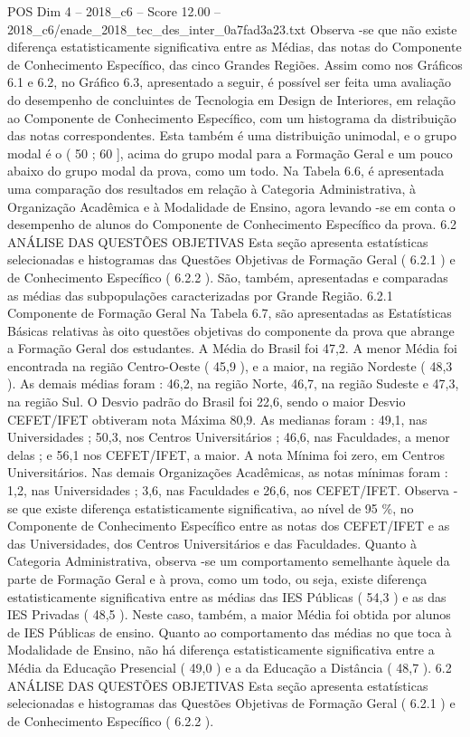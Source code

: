 \begin{textsample}{POS Dim 4 – 2018\_c6 – Score 12.00 – 2018\_c6/enade\_2018\_tec\_des\_inter\_0a7fad3a23.txt}
Observa -se que não existe diferença estatisticamente significativa entre as Médias, das notas do Componente de Conhecimento Específico, das cinco Grandes Regiões.
Assim como nos Gráficos 6.1 e 6.2, no Gráfico 6.3, apresentado a seguir, é possível ser feita uma avaliação do desempenho de concluintes de Tecnologia em Design de Interiores, em relação ao Componente de Conhecimento Específico, com um histograma da distribuição das notas correspondentes.
Esta também é uma distribuição unimodal, e o grupo modal é o ( 50 ; 60 ], acima do grupo modal para a Formação Geral e um pouco abaixo do grupo modal da prova, como um todo.
Na Tabela 6.6, é apresentada uma comparação dos resultados em relação à Categoria Administrativa, à Organização Acadêmica e à Modalidade de Ensino, agora levando -se em conta o desempenho de alunos do Componente de Conhecimento Específico da prova. 6.2 ANÁLISE DAS QUESTÕES OBJETIVAS Esta seção apresenta estatísticas selecionadas e histogramas das Questões Objetivas de Formação Geral ( 6.2.1 ) e de Conhecimento Específico ( 6.2.2 ).
São, também, apresentadas e comparadas as médias das subpopulações caracterizadas por Grande Região. 6.2.1 Componente de Formação Geral Na Tabela 6.7, são apresentadas as Estatísticas Básicas relativas às oito questões objetivas do componente da prova que abrange a Formação Geral dos estudantes.
A Média do Brasil foi 47,2.
A menor Média foi encontrada na região Centro-Oeste ( 45,9 ), e a maior, na região Nordeste ( 48,3 ).
As demais médias foram : 46,2, na região Norte, 46,7, na região Sudeste e 47,3, na região Sul.
O Desvio padrão do Brasil foi 22,6, sendo o maior Desvio CEFET/IFET obtiveram nota Máxima 80,9.
As medianas foram : 49,1, nas Universidades ; 50,3, nos Centros Universitários ; 46,6, nas Faculdades, a menor delas ; e 56,1 nos CEFET/IFET, a maior.
A nota Mínima foi zero, em Centros Universitários.
Nas demais Organizações Acadêmicas, as notas mínimas foram : 1,2, nas Universidades ; 3,6, nas Faculdades e 26,6, nos CEFET/IFET.
Observa -se que existe diferença estatisticamente significativa, ao nível de 95 \%, no Componente de Conhecimento Específico entre as notas dos CEFET/IFET e as das Universidades, dos Centros Universitários e das Faculdades.
Quanto à Categoria Administrativa, observa -se um comportamento semelhante àquele da parte de Formação Geral e à prova, como um todo, ou seja, existe diferença estatisticamente significativa entre as médias das IES Públicas ( 54,3 ) e as das IES Privadas ( 48,5 ).
Neste caso, também, a maior Média foi obtida por alunos de IES Públicas de ensino.
Quanto ao comportamento das médias no que toca à Modalidade de Ensino, não há diferença estatisticamente significativa entre a Média da Educação Presencial ( 49,0 ) e a da Educação a Distância ( 48,7 ). 6.2 ANÁLISE DAS QUESTÕES OBJETIVAS Esta seção apresenta estatísticas selecionadas e histogramas das Questões Objetivas de Formação Geral ( 6.2.1 ) e de Conhecimento Específico ( 6.2.2 ).

\end{textsample}
